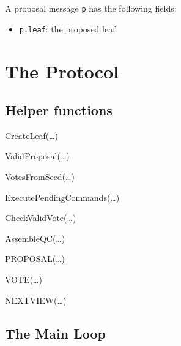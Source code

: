 \documentclass[11pt, oneside]{article}       %
\begin{document}
A proposal message \texttt{p} has the following fields:

\begin{itemize}
    \item \texttt{p.leaf}: the proposed leaf
\end{itemize}

\section{The Protocol}

\SetAlFnt{\scriptsize\tt}

\subsection*{Helper functions}

\begin{procedure}[H]
    \caption{CreateLeaf(\ldots)}
\end{procedure}

\begin{procedure}[H]
    \caption{ValidProposal(\ldots)}
\end{procedure}

\begin{procedure}[H]
    \caption{VotesFromSeed(\ldots)}
\end{procedure}

\begin{procedure}[H]
    \caption{ExecutePendingCommands(\ldots)}
\end{procedure}

\begin{procedure}[H]
    \caption{CheckValidVote(\ldots)}
\end{procedure}

\begin{procedure}[H]
    \caption{AssembleQC(\ldots)}
\end{procedure}

\begin{procedure}[H]
    \caption{PROPOSAL(\ldots)}
\end{procedure}

\begin{procedure}[H]
    \caption{VOTE(\ldots)}
\end{procedure}

\begin{procedure}[H]
    \caption{NEXTVIEW(\ldots)}
\end{procedure}

\subsection*{The Main Loop}
\end{document}
